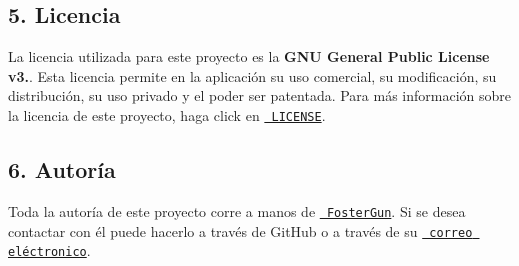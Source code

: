 \subsection*{5. Licencia}

La licencia utilizada para este proyecto es la {\bfseries{G\+NU General Public License v3.}}. Esta licencia permite en la aplicación su uso comercial, su modificación, su distribución, su uso privado y el poder ser patentada. Para más información sobre la licencia de este proyecto, haga click en \href{https://github.com/FosterGun/GAICurricula/blob/FosterGun/LICENSE}{\texttt{ L\+I\+C\+E\+N\+SE}}.

\subsection*{6. Autoría}

Toda la autoría de este proyecto corre a manos de \href{https://github.com/FosterGun}{\texttt{ Foster\+Gun}}. Si se desea contactar con él puede hacerlo a través de Git\+Hub o a través de su \href{mailto:mblanco040@ikasle.ehu.es}{\texttt{ correo eléctronico}}. 